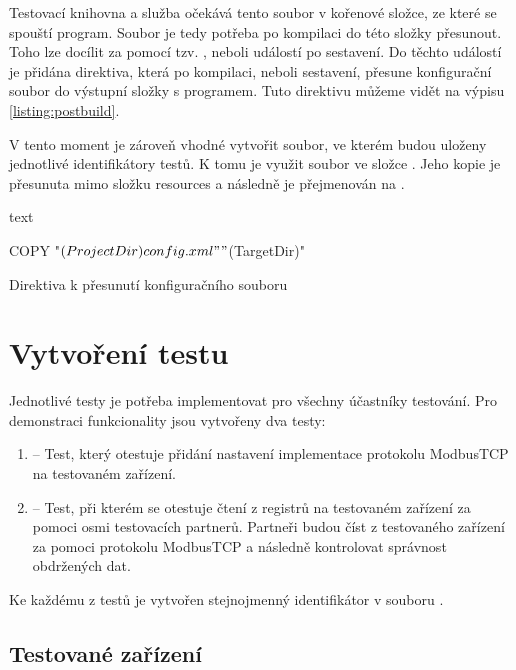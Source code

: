 Testovací knihovna a služba očekává tento soubor v kořenové složce, ze které se spouští program. Soubor je tedy potřeba po kompilaci do této složky přesunout. Toho lze docílit za pomocí tzv. , neboli událostí po sestavení. Do těchto událostí je přidána direktiva, která po kompilaci, neboli sestavení, přesune konfigurační soubor do výstupní složky s programem. Tuto direktivu můžeme vidět na výpisu \ref{listing:postbuild}.

V tento moment je zároveň vhodné vytvořit soubor, ve kterém budou uloženy jednotlivé identifikátory testů. K tomu je využit soubor  ve složce . Jeho kopie je přesunuta mimo složku resources a následně je přejmenován na .

\begin{listing}[H]
    \centering
    \begin{cminted}[breaklines,stripnl=false]{text}

COPY "$(ProjectDir)config.xml"  "$(TargetDir)"
    \end{cminted}
\caption{Direktiva k přesunutí konfiguračního souboru}
\label{listing:postbuild}
\end{listing}

\section{Vytvoření testu}
Jednotlivé testy je potřeba implementovat pro všechny účastníky testování. Pro demonstraci funkcionality jsou vytvořeny dva testy:
\begin{enumerate}
    \item {} -- Test, který otestuje přidání nastavení implementace protokolu ModbusTCP na testovaném zařízení.
    \item {} -- Test, při kterém se otestuje čtení z registrů na testovaném zařízení za pomoci osmi testovacích partnerů. Partneři budou číst z testovaného zařízení za pomoci protokolu ModbusTCP a následně kontrolovat správnost obdržených dat.
\end{enumerate}

Ke každému z testů je vytvořen stejnojmenný identifikátor v souboru .


\subsection{Testované zařízení}

